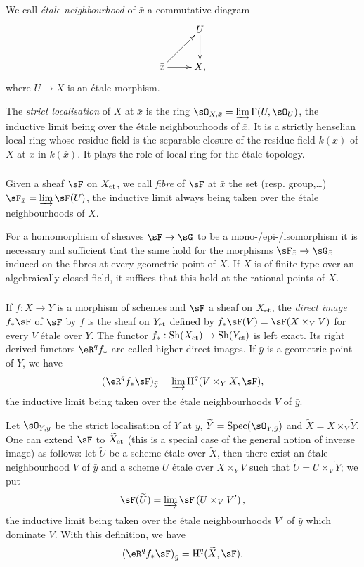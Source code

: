 We call \emph{\'etale neighbourhood} of $\bar x$ a commutative diagram 
\[\xymatrix{
  & U \ar[d] \\
  \bar x \ar[ur] \ar[r] 
  & X\text{,}
}\]
where $U\to X$ is an \'etale morphism. 

The \emph{strict localisation} of $X$ at $\bar x$ is the ring 
$\sO_{X,\bar x} = \varinjlim \Gamma(U,\sO_U)$, the inductive limit being over the 
\'etale neighbourhoods of $\bar x$. It is a strictly henselian local ring whose 
residue field is the separable closure of the residue field $k(x)$ of $X$ at 
$x$ in $k(\bar x)$. It plays the role of local ring for the \'etale topology. 





\subsubsection{}\label{I:2-3-2}

Given a sheaf $\sF$ on ${X}_{\textnormal{et}}$, we call \emph{fibre} of $\sF$ at
$\bar x$ the set (resp. group,\dots) $\sF_{\bar x}=\varinjlim \sF(U)$,
the inductive limit always being taken over the \'etale neighbourhoods of $X$.

For a homomorphism of sheaves $\sF\to \sG$ to be a
mono-/epi-/isomorphism it is necessary and sufficient that the same hold for the morphisms
$\sF_{\bar x}\to \sG_{\bar x}$ induced on the fibres at every geometric point
of $X$. If $X$ is of finite type over an algebraically closed field, it suffices
that this hold at the rational points of $X$. 





\subsubsection{}\label{I:2-3-3}

If $f:X\to Y$ is a morphism of schemes and $\sF$ a sheaf on ${X}_{\textnormal{et}}$,
the \emph{direct image} $f_* \sF$ of $\sF$ by $f$ is the sheaf on ${Y}_{\textnormal{et}}$
defined by $f_* \sF(V) = \sF(X\times_Y V)$ for every $V$ \'etale over $Y$. The functor
$f_*:\operatorname{Sh}({X}_{\textnormal{et}})\to \operatorname{Sh}({Y}_{\textnormal{et}})$ is left exact. Its
right derived functors $\eR^q f_*$ are called higher direct images. If
$\bar y$ is a geometric point of $Y$, we have
\[
  (\eR^q f_* \sF)_{\bar y} = \varinjlim \h^q(V\times_Y X,\sF)\text{,}
\]
the inductive limit being taken over the \'etale neighbourhoods $V$ of $\bar y$. 

Let $\sO_{Y,\bar y}$ be the strict localisation of $Y$ at $\bar y$,
$\widetilde Y=\spec(\sO_{Y,\bar y})$ and $\widetilde X=X\times_Y \widetilde Y$.
One can extend $\sF$ to ${\widetilde X}_{\textnormal{et}}$ (this is a special case of the
general notion of inverse image) as follows: let
$\widetilde U$ be a scheme \'etale over $\widetilde X$, then there exist an
\'etale neighbourhood $V$ of $\bar y$ and a scheme $U$ \'etale over $X\times_Y V$ such
that $\widetilde U=U\times_V \widetilde Y$; we put
\[
  \sF(\widetilde U)=\varinjlim \sF\left(U\times_V V'\right)\text{,}
\]
the inductive limit being taken over the \'etale neighbourhoods $V'$ of $\bar y$ which
dominate $V$. With this definition, we have
\[
  \left(\eR^q f_* \sF\right)_{\bar y} = \h^q(\widetilde X,\sF)\text{.}
\]

